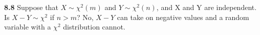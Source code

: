 

{\bf 8.8}  Suppose that $X\sim { \chi  }^{ 2 }(m)$ and $Y\sim { \chi  }^{ 2 }(n)$, and X and Y are independent. Is $X - Y \sim { \chi  }^{ 2 }$ if $n>m$? No, $X-Y$ can take on negative values and a random variable with a $\chi^2$ distribution cannot. \\


